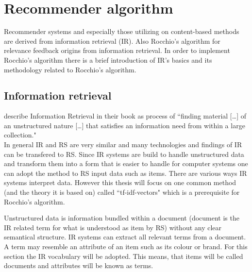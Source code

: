 
\section{Recommender algorithm}
Recommender systems and especially those utilizing on content-based methods are derived from information retrieval (IR).\citep[p.~92-99]{lops:2011}
Also Rocchio's algorithm for relevance feedback origins from information retrieval.\citep[p.~178]{manning:2009}
In order to implement Rocchio's algorithm there is a brief introduction of IR's basics and its methodology related to Rocchio's algorithm.

\subsection{Information retrieval}
\citeauthor{manning:2009} describe Information Retrieval in their book as process of ``finding material [\dots] of an unstructured nature [\dots] that satisfies an information need from within a large collection."\citep[p.~1]{manning:2009}\\
In general IR and RS are very similar and many technologies and findings of IR can be transfered to RS.
Since IR systems are build to handle unstructured data and transform them into a form that is easier to handle for computer systems one can adopt the method to RS input data such as items.\citep[p.~21-23]{ricci:2011}
There are various ways IR systems interpret data.
However this thesis will focus on one common method (and the theory it is based on) called ``tf-idf-vectors" which is a prerequisite for Rocchio's algorithm.\citep[p.~93]{lops:2011}

Unstructured data is information bundled within a document (document is the IR related term for what is understood as item by RS) without any clear semantical structure.\citep[p.~1-3]{manning:2009}
IR systems can extract all relevant terms from a document.
A term may resemble an attribute of an item such as its colour or brand.
For this section the IR vocabulary will be adopted.
This means, that items will be called documents and attributes will be known as terms.

